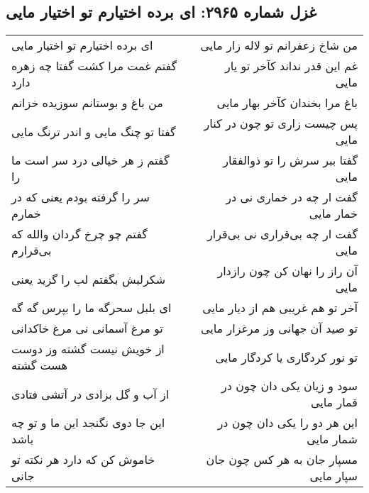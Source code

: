 \begin{center}
\section*{غزل شماره ۲۹۶۵: ای برده اختیارم تو اختیار مایی}
\label{sec:2965}
\begin{longtable}{l p{0.5cm} r}
ای برده اختیارم تو اختیار مایی
&&
من شاخ زعفرانم تو لاله زار مایی
\\
گفتم غمت مرا کشت گفتا چه زهره دارد
&&
غم این قدر نداند کآخر تو یار مایی
\\
من باغ و بوستانم سوزیده خزانم
&&
باغ مرا بخندان کآخر بهار مایی
\\
گفتا تو چنگ مایی و اندر ترنگ مایی
&&
پس چیست زاری تو چون در کنار مایی
\\
گفتم ز هر خیالی درد سر است ما را
&&
گفتا ببر سرش را تو ذوالفقار مایی
\\
سر را گرفته بودم یعنی که در خمارم
&&
گفت ار چه در خماری نی در خمار مایی
\\
گفتم چو چرخ گردان والله که بی‌قرارم
&&
گفت ار چه بی‌قراری نی بی‌قرار مایی
\\
شکرلبش بگفتم لب را گزید یعنی
&&
آن راز را نهان کن چون رازدار مایی
\\
ای بلبل سحرگه ما را بپرس گه گه
&&
آخر تو هم غریبی هم از دیار مایی
\\
تو مرغ آسمانی نی مرغ خاکدانی
&&
تو صید آن جهانی وز مرغزار مایی
\\
از خویش نیست گشته وز دوست هست گشته
&&
تو نور کردگاری یا کردگار مایی
\\
از آب و گل بزادی در آتشی فتادی
&&
سود و زیان یکی دان چون در قمار مایی
\\
این جا دوی نگنجد این ما و تو چه باشد
&&
این هر دو را یکی دان چون در شمار مایی
\\
خاموش کن که دارد هر نکته تو جانی
&&
مسپار جان به هر کس چون جان سپار مایی
\\
\end{longtable}
\end{center}
